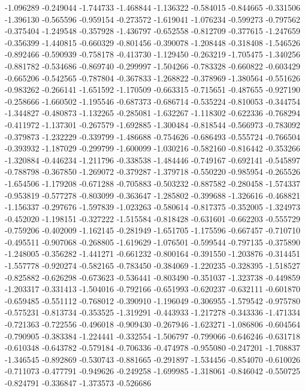 -1.096289
-0.249044
-1.744733
-1.468844
-1.136322
-0.584015
-0.844665
-0.331506
-1.396130
-0.565596
-0.959154
-0.273572
-1.619041
-1.076234
-0.599273
-0.797562
-0.375404
-1.249548
-0.357928
-1.436797
-0.652558
-0.812709
-0.377615
-1.247659
-0.356399
-1.440815
-0.660329
-0.801456
-0.390078
-1.208448
-0.318408
-1.546526
-0.892466
-0.590939
-0.758178
-0.413730
-1.129450
-0.263219
-1.705475
-1.340256
-0.881782
-0.534686
-0.869740
-0.299997
-1.504266
-0.783328
-0.660822
-0.603429
-0.665206
-0.542565
-0.787804
-0.367833
-1.268822
-0.378969
-1.380564
-0.551626
-0.983262
-0.266141
-1.651592
-1.170509
-0.663315
-0.715651
-0.487655
-0.927190
-0.258666
-1.660502
-1.195546
-0.687373
-0.686714
-0.535224
-0.810053
-0.344754
-1.344827
-0.480873
-1.132265
-0.285081
-1.632267
-1.118302
-0.622336
-0.768294
-0.411972
-1.137301
-0.267579
-1.692885
-1.300484
-0.818544
-0.566973
-0.783092
-0.379873
-1.232229
-0.339799
-1.486688
-0.754626
-0.686493
-0.555724
-0.766504
-0.393932
-1.187029
-0.299799
-1.600099
-1.030216
-0.582160
-0.816442
-0.353266
-1.320884
-0.446234
-1.211796
-0.338538
-1.484446
-0.749167
-0.692141
-0.545897
-0.788798
-0.367850
-1.269072
-0.379287
-1.379718
-0.550220
-0.985954
-0.265526
-1.654506
-1.179208
-0.671288
-0.705883
-0.503232
-0.887582
-0.280458
-1.574337
-0.953819
-0.577278
-0.803099
-0.363647
-1.285802
-0.399688
-1.326616
-0.468821
-1.156337
-0.297676
-1.597839
-1.023263
-0.580614
-0.817375
-0.352005
-1.324973
-0.452020
-1.198151
-0.327222
-1.515584
-0.818428
-0.631601
-0.662203
-0.555729
-0.759206
-0.402009
-1.162145
-0.281949
-1.651705
-1.175596
-0.667457
-0.710710
-0.495511
-0.907068
-0.268805
-1.619629
-1.076501
-0.599544
-0.797135
-0.375890
-1.248005
-0.356282
-1.441271
-0.661232
-0.800164
-0.391550
-1.203876
-0.314451
-1.557778
-0.920274
-0.582165
-0.783450
-0.384069
-1.220235
-0.328395
-1.518527
-0.825882
-0.626298
-0.673623
-0.536441
-0.803490
-0.351037
-1.323738
-0.449859
-1.203317
-0.331413
-1.504016
-0.792166
-0.651993
-0.620237
-0.632111
-0.601870
-0.659485
-0.551112
-0.768012
-0.390910
-1.196049
-0.306955
-1.579542
-0.975780
-0.575231
-0.813734
-0.353525
-1.319291
-0.443933
-1.217278
-0.343336
-1.471334
-0.721363
-0.722556
-0.496018
-0.909430
-0.267946
-1.623271
-1.086806
-0.604564
-0.790905
-0.383384
-1.224441
-0.332554
-1.506797
-0.799066
-0.646246
-0.631718
-0.610348
-0.643782
-0.579184
-0.706336
-0.474978
-0.955080
-0.247201
-1.708837
-1.346545
-0.892869
-0.530743
-0.881665
-0.291897
-1.534456
-0.854070
-0.610026
-0.711073
-0.477791
-0.949626
-0.249258
-1.699985
-1.318061
-0.846042
-0.550725
-0.824791
-0.336847
-1.373573
-0.526686
